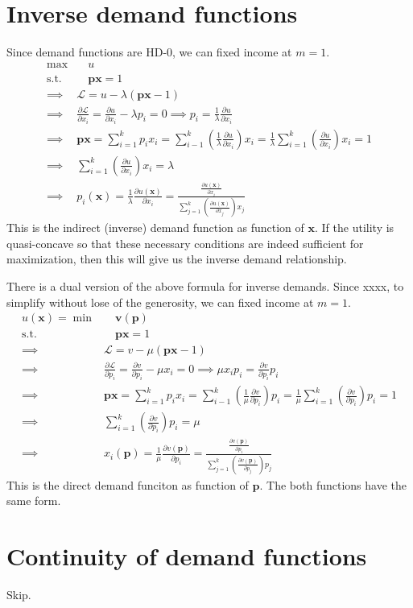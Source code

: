 \section{Inverse demand functions}

Since demand functions are HD-0, we can fixed income at \(m = 1\).
\begin{align*}
    \underset{}{\max} &\quad u \\
    \text{s.t.} &\quad \mathbf{px} = 1 \\
    \implies & \mathcal{L} = u-\lambda(\mathbf{px} -  1) \\
    \implies & \frac{\partial \mathcal{L}}{\partial x_i} = \frac{\partial u}{\partial x_i} - \lambda p_i = 0 \implies p_i = \frac{1}{\lambda} \frac{\partial u}{\partial x_i} \\
    \implies & \mathbf{px} = \sum_{i=1}^{k} p_i x_i = \sum_{i-1}^{k} \left( \frac{1}{\lambda} \frac{\partial u}{\partial x_i} \right) x_i = \frac{1}{\lambda} \sum_{i=1}^{k} \left( \frac{\partial u}{\partial x_i} \right) x_i = 1 \\
    \implies & \sum_{i=1}^{k} \left( \frac{\partial u}{\partial x_i} \right) x_i = \lambda \\
    \implies & p_i(\mathbf x) = \frac{1}{\lambda} \frac{\partial u(\mathbf x)}{\partial x_i} = \frac{\frac{\partial u(\mathbf x)}{\partial x_i}}{\sum_{j=1}^{k} \left( \frac{\partial u(\mathbf x)}{\partial x_j} \right) x_j} 
\end{align*}
This is the indirect (inverse) demand function as function of \( \mathbf x \). 
If the utility is quasi-concave so that these necessary conditions are indeed sufficient for maximization, then this will give us the inverse demand relationship.

There is a dual version of the above formula for inverse demands. Since xxxx, to simplify without lose of the generosity, we can fixed income at \(m = 1\).
\begin{align*}
    u(\mathbf x) = \underset{}{\min} &\quad \mathbf v(\mathbf p) \\
    \text{s.t.} &\quad \mathbf{px} = 1 \\
    \implies & \mathcal{L} = v-\mu(\mathbf{px} -  1) \\
    \implies & \frac{\partial \mathcal{L}}{\partial p_i} = \frac{\partial v}{\partial p_i} - \mu x_i = 0 \implies \mu x_i p_i = \frac{\partial v}{\partial p_i} p_i  \\
    \implies & \mathbf{px} = \sum_{i=1}^{k} p_i x_i = \sum_{i-1}^{k} \left( \frac{1}{\mu} \frac{\partial v}{\partial p_i} \right) p_i = \frac{1}{\mu} \sum_{i=1}^{k} \left( \frac{\partial v}{\partial p_i} \right) p_i = 1 \\
    \implies & \sum_{i=1}^{k} \left( \frac{\partial v}{\partial p_i} \right) p_i = \mu \\
    \implies & x_i(\mathbf p) = \frac{1}{\mu} \frac{\partial v(\mathbf p)}{\partial p_i} = \frac{\frac{\partial v(\mathbf p)}{\partial p_i}}{\sum_{j=1}^{k} \left( \frac{\partial v(\mathbf p)}{\partial p_j} \right) p_j} 
\end{align*}
This is the direct demand funciton as function of \( \mathbf p \). The both functions have the same form.

\section{Continuity of demand functions}

Skip.